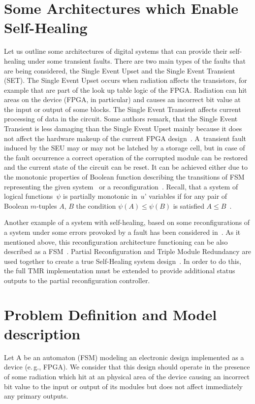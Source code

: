 \begin{multicols}{2}
\section{Some Architectures which Enable Self-Healing}

Let us outline some architectures of digital systems that can
provide their self-healing under some transient faults. There are
two main types of the faults that are being considered, the Single
Event Upset and the Single Event Transient (SET). The Single Event
Upset occurs when radiation affects the transistors, for example
that are part of the look up table logic of the FPGA. Radiation
can hit areas on the device (FPGA, in particular) and causes an
incorrect bit value at the input or output of some blocks. The
Single Event Transient affects current processing of data in the
circuit. Some authors remark, that the Single Event Transient is
less damaging than the Single Event Upset mainly because it does
not affect the hardware makeup of the current FPGA design~\cite{5fr}. 
A~transient fault induced by the SEU may or may not be latched by a
storage cell, but in case of the fault occurrence a correct
operation of the corrupted module can be restored and the current
state of the circuit can be reset. It can be achieved either due
to the monotonic properties of Boolean function describing the
transitions of FSM representing the given system~\cite{5fr} or a reconfiguration~\cite{2fr}. 
Recall, that a system of logical functions~$\psi$ 
is partially monotonic in~$u$' variables if for any pair of
Boolean $m$-tuples $A$, $B$ the condition $\psi(A)\le \psi(B)$ is
satisfied $A\le B$~\cite{6fr}.

Another example of a system with self-healing, based on some
reconfigurations of a system under some errors provoked by a
fault has been considered in~\cite{5fr}. As it mentioned above, this
reconfiguration architecture functioning can be also described as
a FSM~\cite{10fr}. Partial Reconfiguration and Triple Module Redundancy
are used together to create a true Self-Healing system design~\cite{5fr}.
In order to do this, the full TMR implementation must be extended
to provide additional status outputs to the partial
reconfiguration controller.

\section{Problem Definition and Model description}

Let A be an automaton (FSM) modeling an electronic
design implemented as a device (e.\,g., FPGA).
We consider that this design should operate in the
presence of some radiation which hit at an physical
area of the device causing an incorrect bit
value to the input or output of   its modules
but does not affect immediately any primary outputs.


\end{multicols}

